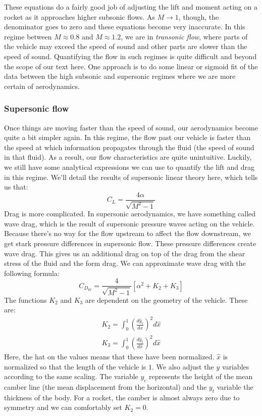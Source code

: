 \documentclass[10pt, openany, titlepage]{book}
\theoremstyle{definition}
\begin{document}
These equations do a fairly good job of adjusting the lift and moment acting on a rocket as it approaches higher subsonic flows. As $M\rightarrow 1$, though, the denominator goes to zero and these equations become very inaccurate. In this regime between $M\approx0.8$ and $M\approx1.2$, we are in \textit{transonic flow}, where parts of the vehicle may exceed the speed of sound and other parts are slower than the speed of sound. Quantifying the flow in such regimes is quite difficult and beyond the scope of our text here. One approach is to do some linear or sigmoid fit of the data between the high subsonic and supersonic regimes where we are more certain of aerodynamics.

\subsubsection{Supersonic flow}

Once things are moving faster than the speed of sound, our aerodynamics become quite a bit simpler again. In this regime, the flow past our vehicle is faster than the speed at which information propagates through the fluid (the speed of sound in that fluid). As a result, our flow characteristics are quite unintuitive. Luckily, we still have some analytical expressions we can use to quantify the lift and drag in this regime. We'll detail the results of supersonic linear theory here, which tells us that:
$$C_L=\frac{4\alpha}{\sqrt{M^2-1}}$$
Drag is more complicated. In supersonic aerodynamics, we have something called \gls{wave drag}, which is the result of supersonic pressure waves acting on the vehicle. Because there's no way for the flow upstream to affect the flow downstream, we get stark pressure differences in supersonic flow. These pressure differences create \gls{wave drag}. This gives us an additional drag on top of the drag from the shear stress of the fluid and the form drag. We can approximate \gls{wave drag} with the following formula:
$$C_{D_W}=\frac{4}{\sqrt{M^2-1}}\left[\alpha^2+K_2+K_3\right]$$
The functions $K_2$ and $K_3$ are dependent on the geometry of the vehicle. These are:
\begin{gather}
    K_2=\int_0^1\left(\frac{d\hat{y}_c}{d\hat{x}}\right)^2d\hat{x}\\
     K_3=\int_0^1\left(\frac{d\hat{y}_t}{d\hat{x}}\right)^2d\hat{x}
\end{gather}
Here, the hat on the values means that these have been normalized. $\hat{x}$ is normalized so that the length of the vehicle is $1$. We also adjust the $y$ variables according to the same scaling. The variable $y_c$ represents the height of the mean camber line (the mean displacement from the horizontal) and the $y_t$ variable the thickness of the body. For a rocket, the camber is almost always zero due to symmetry and we can comfortably set $K_2=0$.
\end{document}
